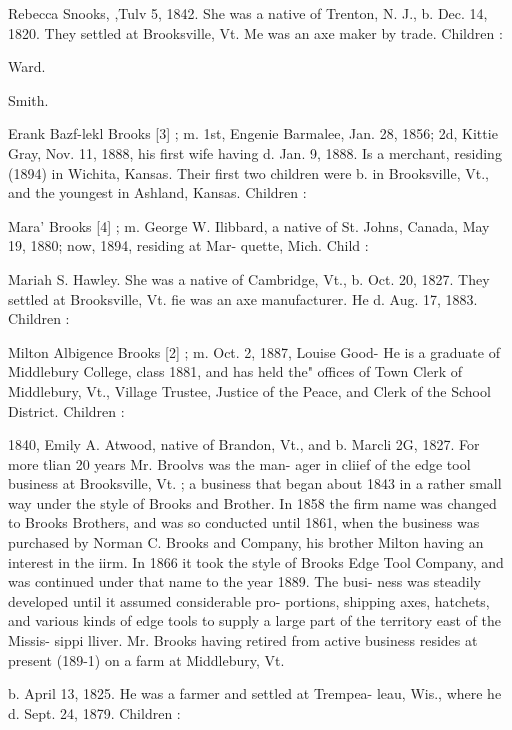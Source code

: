 \documentclass[oneside]{book}
\begin{document}
Rebecca Snooks, ,Tulv 5, 1842. She was a native of Trenton, 
N. J., b. Dec. 14, 1820. They settled at Brooksville, Vt. Me 
was an axe maker by trade. Children : 


Ward. 


Smith. 



Erank Bazf-lekl Brooks [3] ; m. 1st, Engenie Barmalee, Jan. 
28, 1856; 2d, Kittie Gray, Nov. 11, 1888, his first wife having 
d. Jan. 9, 1888. Is a merchant, residing (1894) in Wichita, 
Kansas. Their first two children were b. in Brooksville, Vt., 
and the youngest in Ashland, Kansas. Children : 




Mara' Brooks [4] ; m. George W. Ilibbard, a native of St. 
Johns, Canada, May 19, 1880; now, 1894, residing at Mar- 
quette, Mich. Child : 




Mariah S. Hawley. She was a native of Cambridge, Vt., b. 
Oct. 20, 1827. They settled at Brooksville, Vt. fie was an 
axe manufacturer. He d. Aug. 17, 1883. Children : 



Milton Albigence Brooks [2] ; m. Oct. 2, 1887, Louise Good- 
He is a graduate of Middlebury College, class 1881, and has 
held the" offices of Town Clerk of Middlebury, Vt., Village 
Trustee, Justice of the Peace, and Clerk of the School District. 
Children : 








1840, Emily A. Atwood, native of Brandon, Vt., and b. Marcli 
2G, 1827. For more tlian 20 years Mr. Broolvs was the man- 
ager in cliief of the edge tool business at Brooksville, Vt. ; a 
business that began about 1843 in a rather small way under 
the style of Brooks and Brother. In 1858 the firm name was 
changed to Brooks Brothers, and was so conducted until 1861, 
when the business was purchased by Norman C. Brooks and 
Company, his brother Milton having an interest in the iirm. 
In 1866 it took the style of Brooks Edge Tool Company, and 
was continued under that name to the year 1889. The busi- 
ness was steadily developed until it assumed considerable pro- 
portions, shipping axes, hatchets, and various kinds of edge 
tools to supply a large part of the territory east of the Missis- 
sippi lliver. Mr. Brooks having retired from active business 
resides at present (189-1) on a farm at Middlebury, Vt. 


b. April 13, 1825. He was a farmer and settled at Trempea- 
leau, Wis., where he d. Sept. 24, 1879. Children : 
\end{document}
